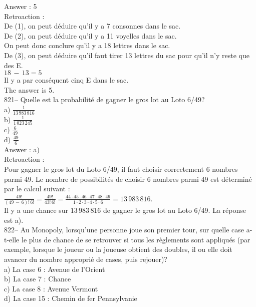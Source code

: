 ﻿\documentclass[letterpaper, 12pt]{article}
\begin{document}
Answer : 5\\

Retroaction : \\
De (1), on peut d\'eduire qu'il y a 7 consonnes dans le sac.\\
De (2), on peut d\'eduire qu'il y a 11 voyelles dans le sac.\\
On peut donc conclure qu'il y a 18 lettres dans le sac.\\
De (3), on peut d\'eduire qu'il faut tirer 13 lettres du sac pour qu'il n'y
reste que des E.  \\
$18\,-\,13=5$\\
Il y a par cons\'equent cinq E dans le sac.\\
The answer is 5.\\


821-- Quelle est la probabilit\'e de gagner le gros lot au Loto 6/49?\\
a) $\frac{1}{13\,983\,816}$\\ [2mm] b) $\frac{1}{1\,023\,245}$\\
[2mm] c) $\frac{6}{49}$\\ [2mm]
d) $\frac{49}{6}$\\

Answer : a)\\

Retroaction : \\
Pour gagner le gros lot du Loto 6/49, il faut choisir correctement 6 nombres
parmi 49.  Le nombre de possibilit\'es de choisir 6 nombres parmi 49 est
d\'etermin\'e par le calcul suivant :\\[2mm]
$\frac{49!}{\left( 49\,-\,6\right)
!\,6!}=\frac{49!}{43!\,6!}=\frac{44\cdot45\cdot46\cdot47\cdot48\cdot49}{1\cdot2\cdot3\cdot4\cdot5\cdot6}=13\,983\,816$.\\[2mm]
Il y a une chance sur $13\,983\,816$ de gagner le gros lot au Loto 6/49.  La
r\'eponse est a).\\

822-- Au Monopoly, lorsqu'une personne joue son premier tour, sur quelle
case a-t-elle le plus de chance de se retrouver si tous les r\`eglements
sont appliqu\'es (par exemple, lorsque le joueur ou la joueuse obtient des
doubles, il ou elle doit avancer du nombre appropri\'e de cases, puis
rejouer)?\\
a) La case 6 : Avenue de l'Orient\\
b) La case 7 : Chance\\
c) La case 8 : Avenue Vermont\\
d) La case 15 : Chemin de fer Pennsylvanie\\
\end{document}
